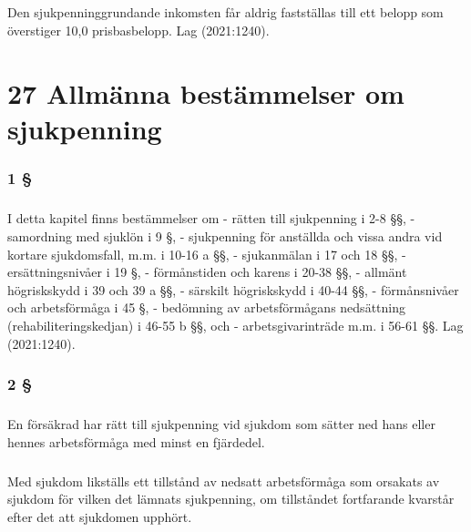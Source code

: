 \documentclass[a4paper,notitlepage,openany,10pt]{book}
\begin{document}
\paragraph*{}
Den sjukpenninggrundande inkomsten får aldrig fastställas till ett belopp som överstiger 10,0 prisbasbelopp.
Lag (2021:1240).
\chapter*{27 Allmänna bestämmelser om sjukpenning}
\subsection*{1 §}
\paragraph*{}
I detta kapitel finns bestämmelser om
\newline - rätten till sjukpenning i 2-8 §§,
\newline - samordning med sjuklön i 9 §,
\newline - sjukpenning för anställda och vissa andra vid kortare sjukdomsfall, m.m. i 10-16 a §§,
\newline - sjukanmälan i 17 och 18 §§,
\newline - ersättningsnivåer i 19 §,
\newline - förmånstiden och karens i 20-38 §§,
\newline - allmänt högriskskydd i 39 och 39 a §§,
\newline - särskilt högriskskydd i 40-44 §§,
\newline - förmånsnivåer och arbetsförmåga i 45 §,
\newline - bedömning av arbetsförmågans nedsättning (rehabiliteringskedjan) i 46-55 b §§, och
\newline - arbetsgivarinträde m.m. i 56-61 §§.
Lag (2021:1240).
\subsection*{2 §}
\paragraph*{}
En försäkrad har rätt till sjukpenning vid sjukdom som sätter ned hans eller hennes arbetsförmåga med minst en fjärdedel.
\paragraph*{}
Med sjukdom likställs ett tillstånd av nedsatt arbetsförmåga som orsakats av sjukdom för vilken det lämnats sjukpenning, om tillståndet fortfarande kvarstår efter det att sjukdomen upphört.
\end{document}
